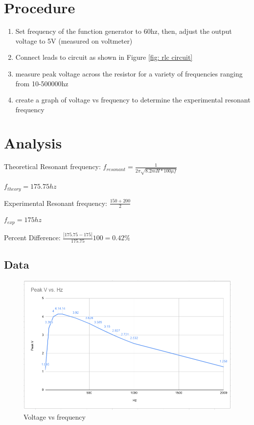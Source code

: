 \documentclass[letterpaper, 12pt]{article}
\begin{document}
\section*{Procedure}

\begin{enumerate}
    \item Set frequency of the function generator to 60hz, 
    then, adjust the output voltage to 5V (measured on voltmeter)
    \item Connect leads to circuit as shown in Figure \ref{fig: rlc circuit}
    \item measure peak voltage across the resistor for a variety of frequencies
    ranging from 10-500000hz
    \item create a graph of voltage vs frequency to determine the experimental 
    resonant frequency 
\end{enumerate}

\section*{Analysis}
\begin{center}
    Theoretical Resonant frequency: $f_{resonant} = \frac{1}{2 \pi \sqrt{8.2mH * 100 \mu f }}$

    $f_{theory} = 175.75hz$

    Experimental Resonant frequency: $\frac{150+200}{2}$

    $f_{exp} = 175hz$

    Percent Difference: $\frac{|175.75 - 175|}{175.75}100 = 0.42\%$
\end{center}
\subsection*{Data}

\begin{figure}[H]
    \label{fig: data}
\end{figure}

\begin{figure}[H]
    \includegraphics[width=\textwidth]{graph1}
    \caption{Voltage vs frequency}
    \label{fig: graph}
\end{figure}
\end{document}
